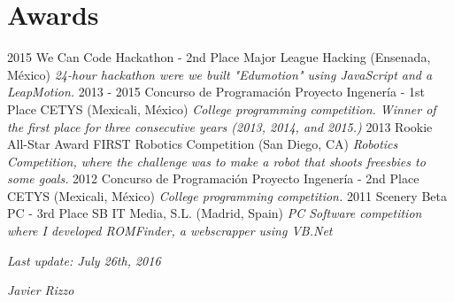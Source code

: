 \documentclass[]{friggeri-cv}
\begin{document}
\section{Awards}
  \entry
    {2015}
    {We Can Code Hackathon - 2nd Place}
    {Major League Hacking (Ensenada, México)}
    {\emph{24-hour hackathon were we built "Edumotion" using JavaScript and a LeapMotion.}}
  \entry
    {2013 - 2015}
    {Concurso de Programación Proyecto Ingenería - 1st Place}
    {CETYS (Mexicali, México)}
    {\emph{College programming competition. Winner of the first place for three consecutive years (2013, 2014, and 2015.)}}
  \entry
    {2013}
    {Rookie All-Star Award}
    {FIRST Robotics Competition (San Diego, CA)}
    {\emph{Robotics Competition, where the challenge was to make a robot that shoots freesbies to some goals.}}
  \entry
    {2012}
    {Concurso de Programación Proyecto Ingenería - 2nd Place}
    {CETYS (Mexicali, México)}
    {\emph{College programming competition.}}
  \entry
    {2011}
    {Scenery Beta PC - 3rd Place}
    {SB IT Media, S.L. (Madrid, Spain)}
    {\emph{PC Software competition where I developed ROMFinder, a webscrapper using VB.Net}}
\\
\begin{flushleft}
\emph{Last update: July 26th, 2016}
\end{flushleft}
\begin{flushright}
\emph{Javier Rizzo}
\end{flushright}
\end{document}
